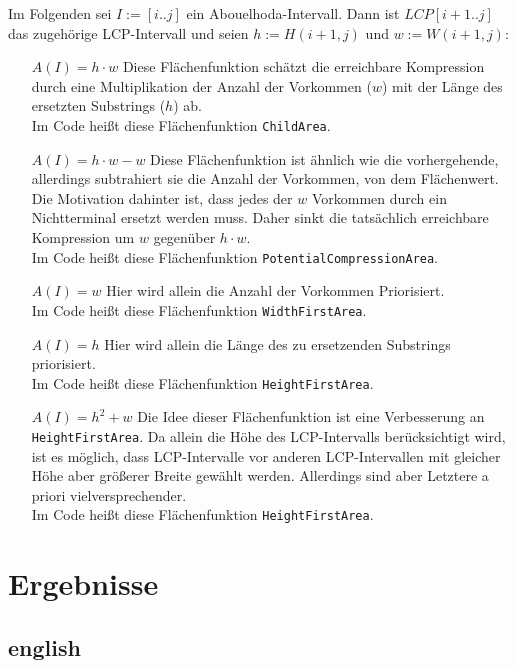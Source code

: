 Im Folgenden sei $I := [i..j]$ ein Abouelhoda-Intervall. Dann ist $LCP[i+1..j]$ das zugehörige LCP-Intervall und seien $h := H(i+1, j)$ und $w := W(i+1, j)$:

\begin{itemize}[leftmargin=2.5cm]
    \item[$A(I) = h \cdot w$] Diese Flächenfunktion schätzt die erreichbare Kompression durch eine Multiplikation der Anzahl der Vorkommen ($w$) mit der Länge des ersetzten Substrings ($h$) ab.\\ Im Code heißt diese Flächenfunktion \texttt{ChildArea}.
    \item[$A(I) = h \cdot w - w$] Diese Flächenfunktion ist ähnlich wie die vorhergehende, allerdings subtrahiert sie die Anzahl der Vorkommen, von dem Flächenwert. Die Motivation dahinter ist, dass jedes der $w$ Vorkommen durch ein Nichtterminal ersetzt werden muss. Daher sinkt die tatsächlich erreichbare Kompression um $w$ gegenüber $h \cdot w$.\\ Im Code heißt diese Flächenfunktion \texttt{PotentialCompressionArea}.
    \item[$A(I) = w$] Hier wird allein die Anzahl der Vorkommen Priorisiert.\\
    Im Code heißt diese Flächenfunktion \texttt{WidthFirstArea}.   
    \item[$A(I) = h$] Hier wird allein die Länge des zu ersetzenden Substrings priorisiert.\\Im Code heißt diese Flächenfunktion \texttt{HeightFirstArea}.
    \item[$A(I) = h^2 + w$] Die Idee dieser Flächenfunktion ist eine Verbesserung an \texttt{HeightFirstArea}. Da allein die Höhe des LCP-Intervalls berücksichtigt wird, ist es möglich, dass LCP-Intervalle vor anderen LCP-Intervallen mit gleicher Höhe aber größerer Breite gewählt werden. Allerdings sind aber Letztere a priori vielversprechender.\\
    Im Code heißt diese Flächenfunktion \texttt{HeightFirstArea}.
\end{itemize}



\section{Ergebnisse}

\subsection{english}

